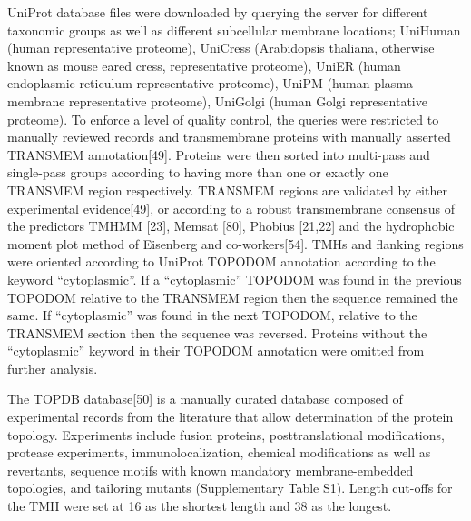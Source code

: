 UniProt database files were downloaded by querying the server for different taxonomic groups as well as different subcellular membrane locations; UniHuman (human representative proteome), UniCress (Arabidopsis thaliana, otherwise known as mouse eared cress, representative proteome), UniER (human endoplasmic reticulum representative proteome), UniPM (human plasma membrane representative proteome), UniGolgi (human Golgi representative proteome). To enforce a level of quality control, the queries were restricted to manually reviewed records and transmembrane proteins with manually asserted TRANSMEM annotation[49]. Proteins were then sorted into multi-pass and single-pass groups according to having more than one or exactly one TRANSMEM region respectively. TRANSMEM regions are validated by either experimental evidence[49], or according to a robust transmembrane consensus of the predictors TMHMM [23], Memsat  [80], Phobius [21,22] and the hydrophobic moment plot method of Eisenberg and co-workers[54]. TMHs and flanking regions were oriented according to UniProt TOPO\textunderscore DOM annotation according to the keyword “cytoplasmic”. If a “cytoplasmic” TOPO\textunderscore DOM was found in the previous TOPO\textunderscore DOM relative to the TRANSMEM region then the sequence remained the same. If “cytoplasmic” was found in the next TOPO\textunderscore DOM, relative to the TRANSMEM section then the sequence was reversed. Proteins without the “cytoplasmic” keyword in their TOPO\textunderscore DOM annotation were omitted from further analysis.

The TOPDB database[50] is a manually curated database composed of experimental records from the literature that allow determination of the protein topology. Experiments include fusion proteins, posttranslational modifications, protease experiments, immunolocalization, chemical modifications as well as revertants, sequence motifs with known mandatory membrane-embedded topologies, and tailoring mutants (Supplementary Table S1). Length cut-offs for the TMH were set at 16 as the shortest length and 38 as the longest.

